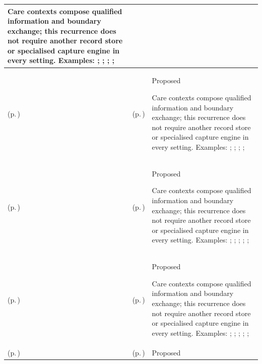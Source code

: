 \begin{longtable}{|>{\raggedright\arraybackslash}p{0.27\TableWidth}|>{\raggedright\arraybackslash}p{0.27\TableWidth}|>{\raggedright\arraybackslash}p{0.46\TableWidth}|}
Care contexts compose qualified information and boundary exchange; this recurrence does not require another record store or specialised capture engine in every setting. Examples: \nameref{feature:feat-sd-17}; \nameref{feature:feat-sd-18}; \nameref{function:provide-outreach-visit-context}; \nameref{function:reconcile-outreach-clinical-batch}; \nameref{service:outreach-batch-reconciliation-service}\\\hline
\nameref{cap:bec-outreach-care} (p.\,\pageref{cap:bec-outreach-care}) & \nameref{cap:ec-08} (p.\,\pageref{cap:ec-08}) & Proposed

Care contexts compose qualified information and boundary exchange; this recurrence does not require another record store or specialised capture engine in every setting. Examples: \nameref{feature:feat-sd-17}; \nameref{feature:feat-sd-18}; \nameref{function:provide-outreach-visit-context}; \nameref{function:reconcile-outreach-clinical-batch}; \nameref{service:outreach-batch-reconciliation-service}\\\hline
\nameref{cap:bec-remote-virtual-care} (p.\,\pageref{cap:bec-remote-virtual-care}) & \nameref{cap:ec-02} (p.\,\pageref{cap:ec-02}) & Proposed

Care contexts compose qualified information and boundary exchange; this recurrence does not require another record store or specialised capture engine in every setting. Examples: \nameref{feature:feat-sd-19}; \nameref{feature:feat-sd-20}; \nameref{function:correlate-virtual-care-consultation-context}; \nameref{service:virtual-encounter-context-resolution}; \nameref{function:ingest-remote-patient-telemetry}; \nameref{service:remote-telemetry-ingress}\\\hline
\nameref{cap:bec-remote-virtual-care} (p.\,\pageref{cap:bec-remote-virtual-care}) & \nameref{cap:ec-04} (p.\,\pageref{cap:ec-04}) & Proposed

Care contexts compose qualified information and boundary exchange; this recurrence does not require another record store or specialised capture engine in every setting. Examples: \nameref{feature:feat-sd-19}; \nameref{feature:feat-sd-20}; \nameref{function:correlate-virtual-care-consultation-context}; \nameref{service:virtual-encounter-context-resolution}; \nameref{function:ingest-remote-patient-telemetry}; \nameref{service:remote-telemetry-ingress}\\\hline
\nameref{cap:bec-remote-virtual-care} (p.\,\pageref{cap:bec-remote-virtual-care}) & \nameref{cap:ec-08} (p.\,\pageref{cap:ec-08}) & Proposed


\end{longtable}
